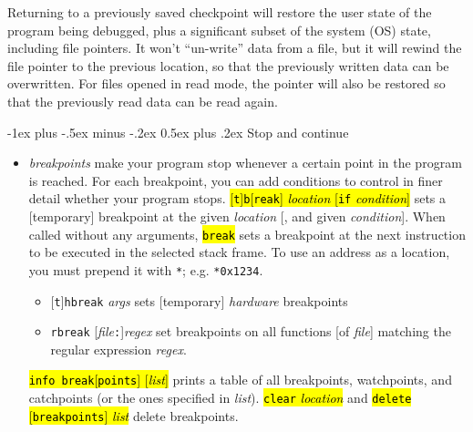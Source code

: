 \documentclass[a4paper,landscape]{article}
\makeatletter
\renewcommand{\section}{\@startsection{section}{1}{0mm}%
                                {-1ex plus -.5ex minus -.2ex}%
                                {0.5ex plus .2ex}%
                                {\normalfont\large\bfseries}}
\makeatother
\begin{document}
\begin{multicols*}{3}
Returning to a previously saved checkpoint will restore the user state of the program
being debugged, plus a significant subset of the system (OS) state, including file pointers. It
won't ``un-write'' data from a file, but it will rewind the file pointer to the previous location,
so that the previously written data can be overwritten. For files opened in read mode, the
pointer will also be restored so that the previously read data can be read again.

\section{Stop and continue}
\begin{itemize}
\item \emph{breakpoints} make your program stop whenever a certain point in the program is reached.  For each breakpoint, you can add conditions to control in finer detail whether your program stops.
\hl{[\texttt{t}]\texttt{b}[\texttt{reak}] \textit{location} [\texttt{if} \textit{condition}]} sets a [temporary] breakpoint at the given \textit{location} [, and given \textit{condition}]. When called without any arguments, \hl{\texttt{break}} sets a breakpoint at the next instruction to be executed in the selected stack frame. To use an address as a location, you must prepend it with \texttt{*}; e.g. \texttt{*0x1234}.
	\begin{itemize}
	\item {}[\texttt{t}]\texttt{hbreak} \textit{args} sets [temporary] \emph{hardware} breakpoints
	\item \texttt{rbreak} [\textit{file}\texttt{:}]\textit{regex} set breakpoints on all functions [of \textit{file}] matching the regular expression \textit{regex}.
	\end{itemize}
\hl{\texttt{info break}[\texttt{points}] [\textit{list}]} prints a table of all breakpoints, watchpoints, and catchpoints (or the ones specified in \textit{list}).
\hl{\texttt{clear} \textit{location}} and \hl{\texttt{delete} [\texttt{breakpoints}] \textit{list}} delete breakpoints.


\end{itemize}
\end{multicols*}
\end{document}
